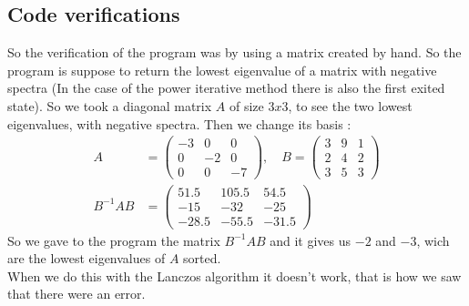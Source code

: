 \documentclass[1pt, a4paper]{article}
\begin{document}
\subsection{Code verifications}
\label{sub:verif}
So the verification of the program was by using a matrix created by hand. So the program is suppose to return the lowest eigenvalue of a matrix with negative spectra (In the case of the power iterative method there is also the first exited state).  So we took a diagonal matrix $A$ of size $3x3$, to see the two lowest eigenvalues, with negative spectra. Then we change its basis :
\begin{equation}
    \begin{aligned}
        A &= \begin{pmatrix}
            -3 & 0 & 0\\
            0 & -2 & 0 \\
            0 & 0 & -7
        \end{pmatrix},\quad B = \begin{pmatrix}
                                3 & 9 & 1\\
                                2&4&2\\
                                3&5&3
                            \end{pmatrix}\\
        B^{-1}AB &= \begin{pmatrix}
                        51.5&105.5&54.5\\
                        -15&-32&-25\\
                        -28.5&-55.5&-31.5
                    \end{pmatrix}
    \end{aligned}
\end{equation}
So we gave to the program the matrix $B^{-1}AB$ and it gives us $-2$ and $-3$, wich are the lowest eigenvalues of $A$ sorted.\\
When we do this with the Lanczos algorithm it doesn't work, that is how we saw that there were an error.
\end{document}
